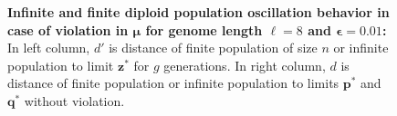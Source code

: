 \begin{figure}[h]
\begin{center}
\hspace{-3em}%
\vspace{-0.5em}  \hspace{-3em}%


\caption[\textbf{Infinite and finite diploid population oscillation behavior in case of violation in $\bm{\mu}$ for genome length $\ell = 8$ and $\bm{\epsilon} = 0.01$}]{\textbf{Infinite and finite diploid population oscillation behavior in case of violation in $\bm{\mu}$ for genome length $\ell = 8$ and $\bm{\epsilon} = 0.01$:} 
  In left column, $d'$ is distance of finite population of size $n$ or infinite population to limit $\bm{z}^\ast$ for $g$ generations. In right column, $d$ is distance of finite population or infinite population to limits $\bm{p}^\ast$ and $\bm{q}^\ast$ without violation.}
\label{oscillation_8d_vio_mu_0.01}
\end{center}
\end{figure}

